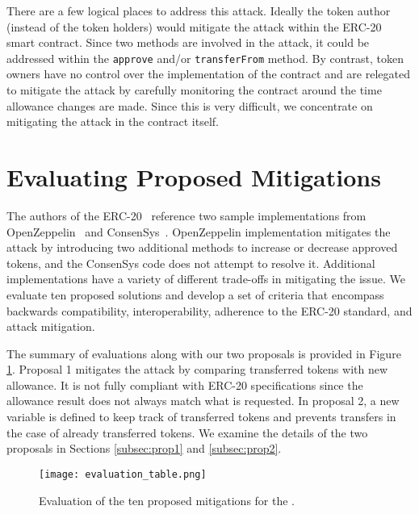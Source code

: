 There are a few logical places to address this attack. Ideally the token author (instead of the token holders) would mitigate the attack within the ERC-20 smart contract. Since two methods are involved in the attack, it could be addressed within the \texttt{approve} and/or \texttt{transferFrom} method. By contrast, token owners have no control over the implementation of the contract and are relegated to mitigate the attack by carefully monitoring the contract around the time allowance changes are made. Since this is very difficult, we concentrate on mitigating the attack in the contract itself.

\section{Evaluating Proposed Mitigations}
The authors of the ERC-20~\cite{Interface} reference two sample implementations from OpenZeppelin~\cite{OpenZeppelin_Token} and ConsenSys~\cite{ConsenSys_Token}. OpenZeppelin implementation mitigates the attack by introducing two additional methods to increase or decrease approved tokens, and the ConsenSys code does not attempt to resolve it. Additional implementations have a variety of different trade-offs in mitigating the issue. We evaluate ten proposed solutions and develop a set of criteria that encompass backwards compatibility, interoperability, adherence to the ERC-20 standard, and attack mitigation. 

The summary of evaluations along with our two proposals is provided in Figure \ref{fig:mitigations}. Proposal 1 mitigates the attack by comparing transferred tokens with new allowance. It is not fully compliant with ERC-20 specifications since the allowance result does not always match what is requested. In proposal 2, a new variable is defined to keep track of transferred tokens and prevents transfers in the case of already transferred tokens. We examine the details of the two proposals in Sections \ref{subsec:prop1} and \ref{subsec:prop2}.

\begin{figure}[t]
	\centering
	\texttt{[image: evaluation\_table.png]}
	\caption[Evaluation of ten \mwa mitigation proposals]{Evaluation of the ten proposed mitigations for the \mwa.}
	\label{fig:mitigations}
\end{figure}

